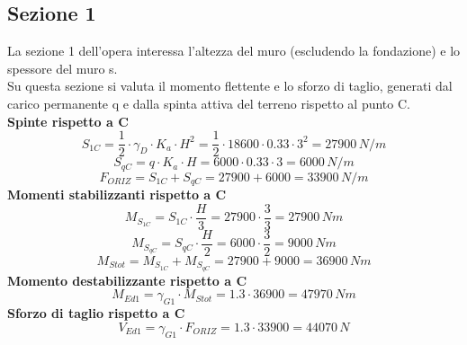 \subsection{Sezione 1}
La sezione 1 dell'opera interessa l'altezza del muro (escludendo la fondazione) e lo spessore del muro s.\\
Su questa sezione si valuta il momento flettente e lo sforzo di taglio, generati dal carico permanente q e dalla spinta attiva del terreno rispetto al punto C.\\
\textbf{Spinte rispetto a C}
\begin{equation*}
    S_{1C} = \frac{1}{2} \cdot \gamma_D \cdot K_a \cdot H^2 = \frac{1}{2} \cdot 18600 \cdot 0.33 \cdot 3^2 = 27900 \,N/m
\end{equation*}
\begin{equation*}
    S_{qC} = q \cdot K_a \cdot H = 6000 \cdot 0.33 \cdot 3 = 6000 \,N/m
\end{equation*}
\begin{equation*}
    F_{ORIZ} = S_{1C} + S_{qC} = 27900 + 6000 = 33900 \,N/m
\end{equation*}
\textbf{Momenti stabilizzanti rispetto a C}
\begin{equation*}
M_{S_{1C}} = S_{1C} \cdot \frac{H}{3} = 27900 \cdot \frac{3}{3} = 27900 \,Nm    
\end{equation*}
\begin{equation*}
M_{S_{qC}} = S_{qC} \cdot \frac{H}{2} = 6000 \cdot \frac{3}{2} = 9000 \,Nm    
\end{equation*}
\begin{equation*}
    M_{Stot} = M_{S_{1C}} + M_{S_{qC}} = 27900 + 9000 = 36900 \,Nm
\end{equation*}
\textbf{Momento destabilizzante rispetto a C}
\begin{equation*}
    M_{Ed1} = \gamma_{G1} \cdot M_{Stot} = 1.3 \cdot 36900 = 47970\, Nm
\end{equation*}
\textbf{Sforzo di taglio rispetto a C}
\begin{equation*}
    V_{Ed1} = \gamma_{G1} \cdot F_{ORIZ} = 1.3 \cdot 33900 = 44070 \,N
\end{equation*}

